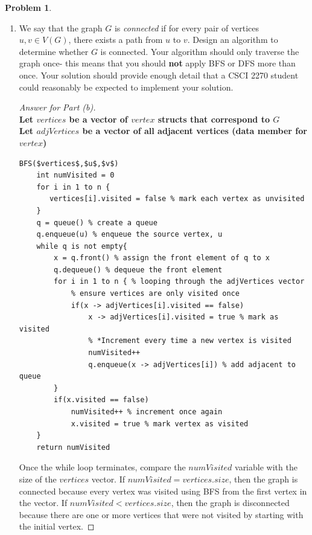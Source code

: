\documentclass[11pt]{article}
\theoremstyle{definition}
\theoremstyle{definition}
\newtheorem{required}{Problem}
\theoremstyle{definition}
\begin{document}
\begin{required}
\begin{enumerate}[label=(\alph*)]
\newpage
\item We say that the graph $G$ is \textit{connected} if for every pair of vertices $u, v \in V(G)$, there exists a path from $u$ to $v$. Design an algorithm to determine whether $G$ is connected. Your algorithm should only traverse the graph once- this means that you should \textbf{not} apply BFS or DFS more than once. Your solution should provide enough detail that a CSCI 2270 student could reasonably be expected to implement your solution.

\begin{proof}[Answer for Part (b)] $ $ \\
\textbf{Let $vertices$ be a vector of $vertex$ structs that correspond to $G$} \\
\textbf{Let $adjVertices$ be a vector of all adjacent vertices (data member for $vertex$)} 
\begin{lstlisting}
BFS($vertices$,$u$,$v$)
    int numVisited = 0
    for i in 1 to n {
       vertices[i].visited = false % mark each vertex as unvisited
    }
    q = queue() % create a queue
    q.enqueue(u) % enqueue the source vertex, u 
    while q is not empty{ 
        x = q.front() % assign the front element of q to x
        q.dequeue() % dequeue the front element
        for i in 1 to n { % looping through the adjVertices vector
            % ensure vertices are only visited once 
            if(x -> adjVertices[i].visited == false) 
                x -> adjVertices[i].visited = true % mark as visited
                % *Increment every time a new vertex is visited
                numVisited++ 
                q.enqueue(x -> adjVertices[i]) % add adjacent to queue
        }
        if(x.visited == false) 
            numVisited++ % increment once again 
            x.visited = true % mark vertex as visited
    }
    return numVisited
\end{lstlisting}
Once the while loop terminates, compare the $numVisited$ variable with the size of the $vertices$ vector. If $numVisited = vertices.size$, then the graph is connected because every vertex was visited using BFS from the first vertex in the vector. If $numVisited < vertices.size$, then the graph is disconnected because there are one or more vertices that were not visited by starting with the initial vertex.
\end{proof}
\end{enumerate}
\end{required}


\newpage
\end{document}
